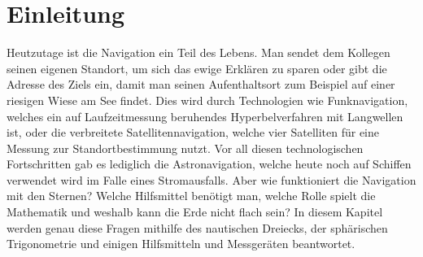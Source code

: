 

\section{Einleitung}
Heutzutage ist die Navigation ein Teil des Lebens. 
%
Man sendet dem Kollegen seinen eigenen Standort, um sich das ewige Erklären zu sparen oder gibt die Adresse des Ziels ein, damit man seinen Aufenthaltsort zum Beispiel auf einer riesigen Wiese am See findet. 
Dies wird durch Technologien wie Funknavigation, welches ein auf Laufzeitmessung beruhendes Hyperbelverfahren mit Langwellen ist, oder die verbreitete Satellitennavigation, welche vier Satelliten für eine Messung zur Standortbestimmung nutzt.
%
%
Vor all diesen technologischen Fortschritten gab es lediglich die Astronavigation, welche heute noch auf Schiffen verwendet wird im Falle eines Stromausfalls. 
Aber wie funktioniert die Navigation mit den Sternen? Welche Hilfsmittel benötigt man, welche Rolle spielt die Mathematik und weshalb kann die Erde nicht flach sein? 
In diesem Kapitel werden genau diese Fragen mithilfe des nautischen Dreiecks, der sphärischen Trigonometrie und einigen Hilfsmitteln und Messgeräten beantwortet.
%
